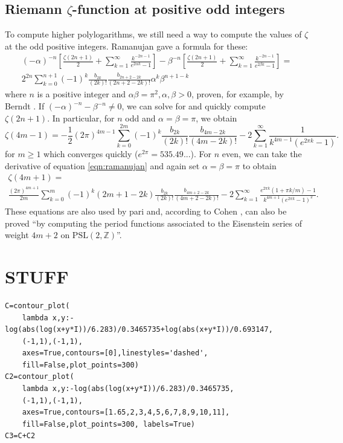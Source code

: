 \documentclass[utopia]{nmd/article}
\begin{document}
\subsection{Riemann $\zeta$-function at positive odd integers}
To compute higher polylogarithms, we still need a way to compute the values of $\zeta$ at the odd positive integers. Ramanujan gave a formula for these:
\begin{multline}
(-\alpha)^{-n}\left[\frac{\zeta(2n+1)}{2} + \sum_{k=1}^\infty \frac{k^{-2n-1}}{e^{2\alpha k}-1}\right]-
\beta^{-n}\left[\frac{\zeta(2n+1)}{2} + \sum_{k=1}^\infty \frac{k^{-2n-1}}{e^{2\beta k}-1}\right]=\\
2^{2n} \sum_{k=0}^{n+1} (-1)^k \frac{b_{2k}}{(2k)!} \frac{b_{2n+2-2k}}{(2n+2-2k)!} \alpha^k \beta^{n+1-k} \label{eqn:ramanujan}
\end{multline}
where $n$ is a positive integer and $\alpha\beta=\pi^2, \alpha, \beta > 0$, proven, for example, by Berndt \cite{berndt:ramanujan}. If $(-\alpha)^{-n}-\beta^{-n}\neq 0$, we can solve for and quickly compute $\zeta(2n+1)$. In particular, for $n$ odd and $\alpha=\beta=\pi$, we obtain
$$\zeta(4m-1) =  - \frac{1}{2}(2\pi)^{4m-1}\sum_{k=0}^{2m} (-1)^k \frac{b_{2k}}{(2k)!} \frac{b_{4m-2k}}{(4m-2k)!} -2 \sum_{k=1}^\infty \frac{1}{k^{4m-1}\left(e^{2\pi k} - 1\right)}.$$
for $m\geq 1$ which converges quickly ($e^{2\pi}=535.49...$). For $n$ even, we can take the derivative of equation \eqref{eqn:ramanujan} and again set $\alpha=\beta=\pi$ to obtain
\begin{multline}
\zeta(4m+1) =\\ \frac{(2\pi)^{4m+1}}{2m} \sum_{k=0}^m (-1)^k (2m+1-2k) \frac{b_{2k}}{(2k)!} \frac{b_{4m+2-2k}}{(4m+2-2k)!} - 2 \sum_{k=1}^\infty \frac{e^{2\pi k} (1 + \pi k / m) - 1}{k^{4m+1}(e^{2\pi k}-1)^2}.
\end{multline}
These equations are also used by pari and, according to Cohen \cite{cohen:hardyLittlewood}, can also be proved ``by computing the period functions associated to the Eisenstein series of weight $4m+2$ on $\mathrm{PSL}(2,\mathbb{Z})$''.%





\section{STUFF}

\begin{verbatim}
C=contour_plot(
    lambda x,y:-log(abs(log(x+y*I))/6.283)/0.3465735+log(abs(x+y*I))/0.693147,
    (-1,1),(-1,1),
    axes=True,contours=[0],linestyles='dashed',
    fill=False,plot_points=300)
C2=contour_plot(
    lambda x,y:-log(abs(log(x+y*I))/6.283)/0.3465735,
    (-1,1),(-1,1),
    axes=True,contours=[1.65,2,3,4,5,6,7,8,9,10,11],
    fill=False,plot_points=300, labels=True)
C3=C+C2
\end{verbatim}






\end{document}
